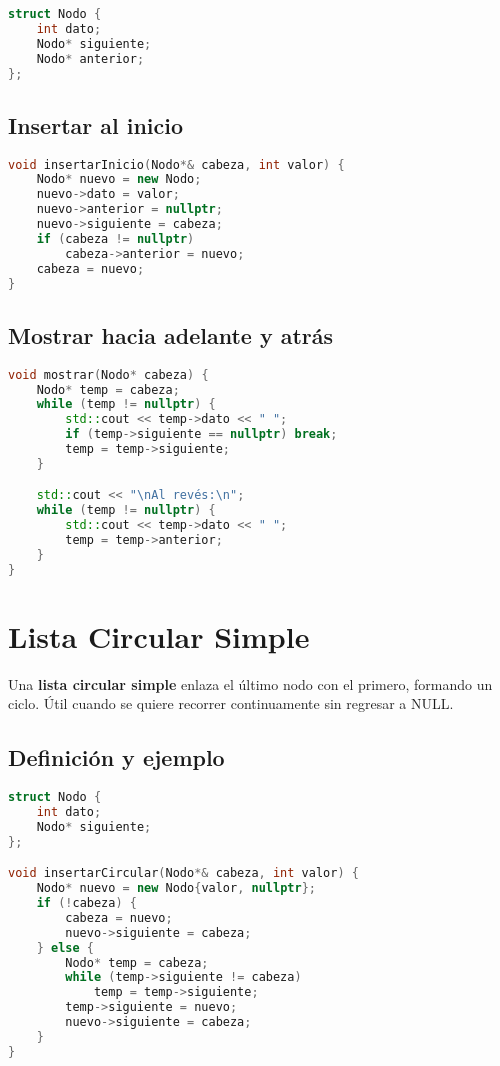 \documentclass[a4paper]{article}
\begin{document}
\begin{lstlisting}[language=C++]
struct Nodo {
    int dato;
    Nodo* siguiente;
    Nodo* anterior;
};
\end{lstlisting}

\subsection*{Insertar al inicio}

\begin{lstlisting}[language=C++]
void insertarInicio(Nodo*& cabeza, int valor) {
    Nodo* nuevo = new Nodo;
    nuevo->dato = valor;
    nuevo->anterior = nullptr;
    nuevo->siguiente = cabeza;
    if (cabeza != nullptr)
        cabeza->anterior = nuevo;
    cabeza = nuevo;
}
\end{lstlisting}

\subsection*{Mostrar hacia adelante y atrás}

\begin{lstlisting}[language=C++]
void mostrar(Nodo* cabeza) {
    Nodo* temp = cabeza;
    while (temp != nullptr) {
        std::cout << temp->dato << " ";
        if (temp->siguiente == nullptr) break;
        temp = temp->siguiente;
    }

    std::cout << "\nAl revés:\n";
    while (temp != nullptr) {
        std::cout << temp->dato << " ";
        temp = temp->anterior;
    }
}
\end{lstlisting}

\section{Lista Circular Simple}

Una \textbf{lista circular simple} enlaza el último nodo con el primero, formando un ciclo. Útil cuando se quiere recorrer continuamente sin regresar a NULL.

\subsection*{Definición y ejemplo}

\begin{lstlisting}[language=C++]
struct Nodo {
    int dato;
    Nodo* siguiente;
};

void insertarCircular(Nodo*& cabeza, int valor) {
    Nodo* nuevo = new Nodo{valor, nullptr};
    if (!cabeza) {
        cabeza = nuevo;
        nuevo->siguiente = cabeza;
    } else {
        Nodo* temp = cabeza;
        while (temp->siguiente != cabeza)
            temp = temp->siguiente;
        temp->siguiente = nuevo;
        nuevo->siguiente = cabeza;
    }
}
\end{lstlisting}
\end{document}

